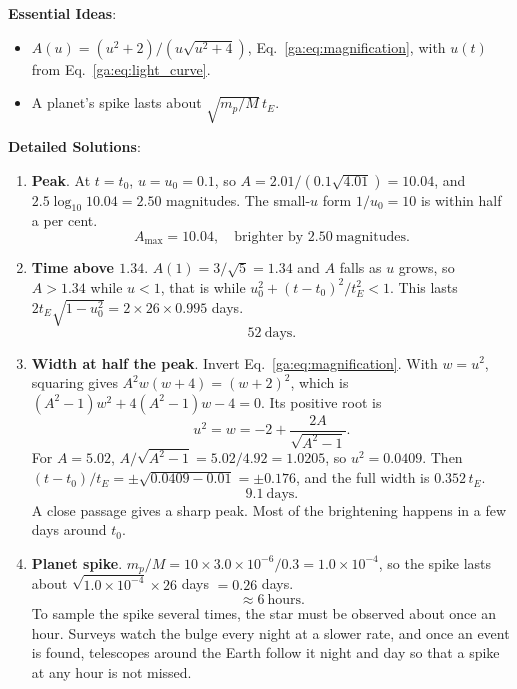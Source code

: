 \textbf{Essential Ideas}:
\begin{itemize}
	\item $A(u)=(u^2+2)/(u\sqrt{u^2+4})$, Eq.~\eqref{ga:eq:magnification}, with $u(t)$ from Eq.~\eqref{ga:eq:light_curve}.
	\item A planet's spike lasts about $\sqrt{m_p/M}\,t_E$.
\end{itemize}

\textbf{Detailed Solutions}:
\begin{enumerate}[label=(\alph*)]
	\item \textbf{Peak}. At $t=t_0$, $u=u_0=0.1$, so $A=2.01/(0.1\sqrt{4.01})=10.04$, and $2.5\log_{10}10.04=2.50$ magnitudes. The small-$u$ form $1/u_0=10$ is within half a per cent.
	\[
	\boxed{A_{\max}=10.04,\quad\text{brighter by }2.50\ \text{magnitudes}.}
	\]
	\item \textbf{Time above $1.34$}. $A(1)=3/\sqrt5=1.34$ and $A$ falls as $u$ grows, so $A>1.34$ while $u<1$, that is while $u_0^2+(t-t_0)^2/t_E^2<1$. This lasts $2t_E\sqrt{1-u_0^2}=2\times26\times0.995$ days.
	\[
	\boxed{52\ \text{days}.}
	\]
	\item \textbf{Width at half the peak}. Invert Eq.~\eqref{ga:eq:magnification}. With $w=u^2$, squaring gives $A^2w(w+4)=(w+2)^2$, which is $(A^2-1)w^2+4(A^2-1)w-4=0$. Its positive root is
	\[
	u^2=w=-2+\frac{2A}{\sqrt{A^2-1}} .
	\]
	For $A=5.02$, $A/\sqrt{A^2-1}=5.02/4.92=1.0205$, so $u^2=0.0409$. Then $(t-t_0)/t_E=\pm\sqrt{0.0409-0.01}=\pm0.176$, and the full width is $0.352\,t_E$.
	\[
	\boxed{9.1\ \text{days}.}
	\]
	A close passage gives a sharp peak. Most of the brightening happens in a few days around $t_0$.
	\item \textbf{Planet spike}. $m_p/M=10\times3.0\times10^{-6}/0.3=1.0\times10^{-4}$, so the spike lasts about $\sqrt{1.0\times10^{-4}}\times26$ days $=0.26$ days.
	\[
	\boxed{\approx6\ \text{hours}.}
	\]
	To sample the spike several times, the star must be observed about once an hour. Surveys watch the bulge every night at a slower rate, and once an event is found, telescopes around the Earth follow it night and day so that a spike at any hour is not missed.
\end{enumerate}
